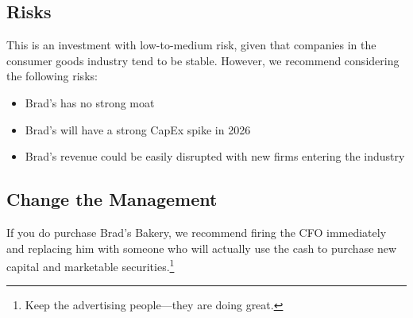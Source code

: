 \documentclass[11pt]{article}
\begin{document}
    \subsection{Risks}
        This is an investment with low-to-medium risk, given that companies in the consumer goods industry tend to be stable. However, we recommend considering the following risks:
        \begin{itemize}
            \item Brad's has no strong moat
            \item Brad's will have a strong CapEx spike in 2026
            \item Brad's revenue could be easily disrupted with new firms entering the industry
        \end{itemize}
    \subsection{Change the Management}
        If you do purchase Brad's Bakery, we recommend firing the CFO immediately and replacing him with someone who will actually use the cash to purchase new capital and marketable securities.\footnote{Keep the advertising people---they are doing great.}
\end{document}
